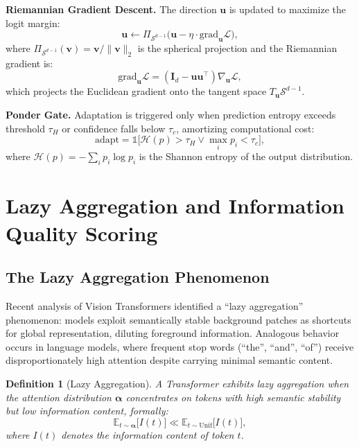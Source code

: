 \documentclass[twocolumn]{article}
\newtheorem{definition}{Definition}
\begin{document}
\textbf{Riemannian Gradient Descent.} The direction $\mathbf{u}$ is updated to maximize the logit margin:
\begin{equation}
\mathbf{u} \leftarrow \Pi_{\mathcal{S}^{d-1}}\bigl(\mathbf{u} - \eta \cdot \mathrm{grad}_{\mathbf{u}} \mathcal{L}\bigr),
\label{eq:qttt-update}
\end{equation}
where $\Pi_{\mathcal{S}^{d-1}}(\mathbf{v}) = \mathbf{v} / \|\mathbf{v}\|_2$ is the spherical projection and the Riemannian gradient is:
\begin{equation}
\mathrm{grad}_{\mathbf{u}} \mathcal{L} = (\mathbf{I}_d - \mathbf{u}\mathbf{u}^\top) \nabla_{\mathbf{u}} \mathcal{L},
\end{equation}
which projects the Euclidean gradient onto the tangent space $T_{\mathbf{u}}\mathcal{S}^{d-1}$.

\textbf{Ponder Gate.} Adaptation is triggered only when prediction entropy exceeds threshold $\tau_H$ or confidence falls below $\tau_c$, amortizing computational cost:
\begin{equation}
\mathrm{adapt} = \mathbb{1}\bigl[\mathcal{H}(p) > \tau_H \lor \max_i p_i < \tau_c\bigr],
\end{equation}
where $\mathcal{H}(p) = -\sum_i p_i \log p_i$ is the Shannon entropy of the output distribution.

\section{Lazy Aggregation and Information Quality Scoring}
\label{sec:info-quality}

\subsection{The Lazy Aggregation Phenomenon}

Recent analysis of Vision Transformers \cite{lastvit} identified a ``lazy aggregation'' phenomenon: models exploit semantically stable background patches as shortcuts for global representation, diluting foreground information. Analogous behavior occurs in language models, where frequent stop words (``the'', ``and'', ``of'') receive disproportionately high attention despite carrying minimal semantic content.

\begin{definition}[Lazy Aggregation]
A Transformer exhibits lazy aggregation when the attention distribution $\boldsymbol{\alpha}$ concentrates on tokens with high semantic stability but low information content, formally:
\begin{equation}
\mathbb{E}_{t \sim \boldsymbol{\alpha}}\bigl[I(t)\bigr] \ll \mathbb{E}_{t \sim \mathrm{Unif}}\bigl[I(t)\bigr],
\end{equation}
where $I(t)$ denotes the information content of token $t$.
\end{definition}
\end{document}
